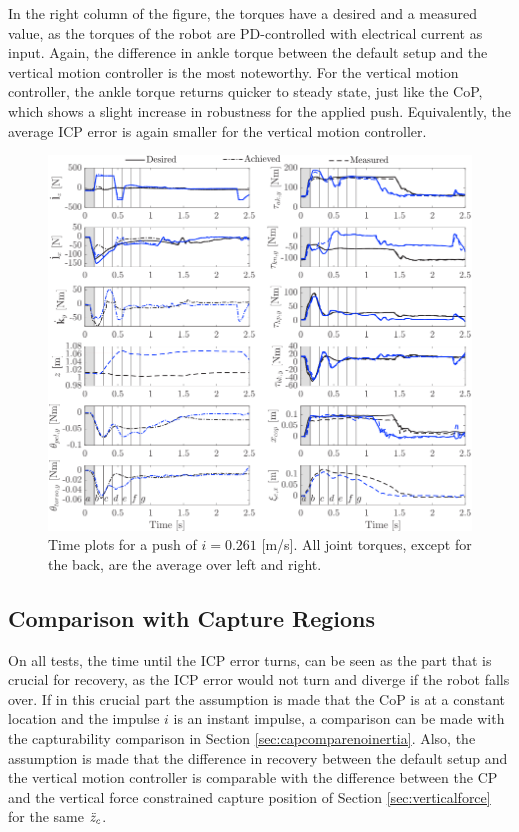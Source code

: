 In the right column of the figure, the torques have a desired and a measured value, as the torques of the robot are PD-controlled with electrical current as input. Again, the difference in ankle torque between the default setup and the vertical motion controller is the most noteworthy. For the vertical motion controller, the ankle torque returns quicker to steady state, just like the \ac{CoP}, which shows a slight increase in robustness for the applied push. Equivalently, the average \ac{ICP} error is again smaller for the vertical motion controller.
\begin{figure}
\centering
\includegraphics[width=1.0\textwidth]{STYLESTUFF/valcomparetimeHW.png}
\caption{Time plots for a push of $i=0.261$ [m/s]. All joint torques, except for the back, are the average over left and right.}
\label{fig:valcomparetimeHW}
\end{figure}


\subsection{Comparison with Capture Regions}
On all tests, the time until the \ac{ICP} error turns, can be seen as the part that is crucial for recovery, as the \ac{ICP} error would not turn and diverge if the robot falls over. If in this crucial part the assumption is made that the \ac{CoP} is at a constant location and the impulse $i$ is an instant impulse, a comparison can be made with the capturability comparison in Section \ref{sec:capcomparenoinertia}. Also, the assumption is made that the difference in recovery between the default setup and the vertical motion controller is comparable with the difference between the \ac{CP} and the vertical force constrained capture position of Section \ref{sec:verticalforce} for the same $\ddot{z}_{c}$.

